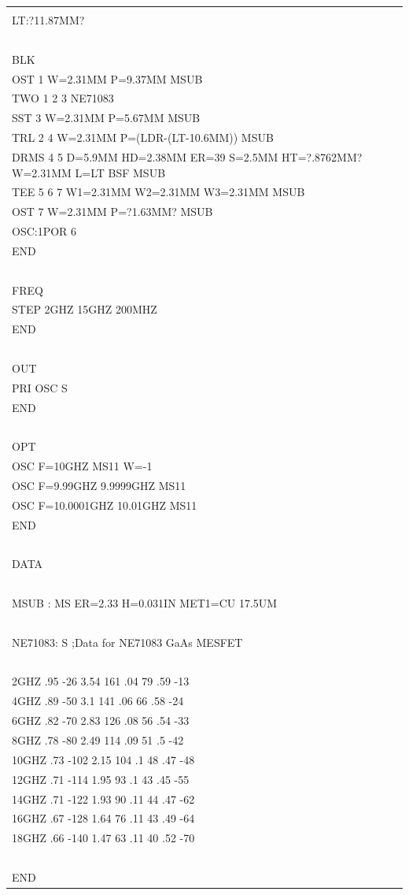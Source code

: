 \begin{longtable}[]{@{}l@{}}
\toprule
\endhead
\begin{minipage}[t]{0.97\columnwidth}\raggedright
\begin{quote}
LDR:4.77MM\\
LT:?11.87MM?\\
~\\
BLK\\
OST 1 W=2.31MM P=9.37MM MSUB\\
TWO 1 2 3 NE71083\\
SST 3 W=2.31MM P=5.67MM MSUB\\
TRL 2 4 W=2.31MM P=(LDR-(LT-10.6MM)) MSUB\\
DRMS 4 5 D=5.9MM HD=2.38MM ER=39 S=2.5MM HT=?.8762MM? W=2.31MM L=LT BSF
MSUB\\
TEE 5 6 7 W1=2.31MM W2=2.31MM W3=2.31MM MSUB\\
OST 7 W=2.31MM P=?1.63MM? MSUB\\
OSC:1POR 6\\
END\\
~\\
FREQ\\
STEP 2GHZ 15GHZ 200MHZ\\
END\\
~\\
OUT\\
PRI OSC S\\
END\\
~\\
OPT\\
OSC F=10GHZ MS11 W=-1\\
OSC F=9.99GHZ 9.9999GHZ MS11\\
OSC F=10.0001GHZ 10.01GHZ MS11\\
END\\
~\\
DATA\\
~\\
MSUB : MS ER=2.33 H=0.031IN MET1=CU 17.5UM\\
~\\
NE71083: S ;Data for NE71083 GaAs MESFET\\
~\\
2GHZ .95 -26 3.54 161 .04 79 .59 -13\\
4GHZ .89 -50 3.1 141 .06 66 .58 -24\\
6GHZ .82 -70 2.83 126 .08 56 .54 -33\\
8GHZ .78 -80 2.49 114 .09 51 .5 -42\\
10GHZ .73 -102 2.15 104 .1 48 .47 -48\\
12GHZ .71 -114 1.95 93 .1 43 .45 -55\\
14GHZ .71 -122 1.93 90 .11 44 .47 -62\\
16GHZ .67 -128 1.64 76 .11 43 .49 -64\\
18GHZ .66 -140 1.47 63 .11 40 .52 -70\\
~\\
END
\end{quote}\strut
\end{minipage}\tabularnewline
\bottomrule
\end{longtable}

